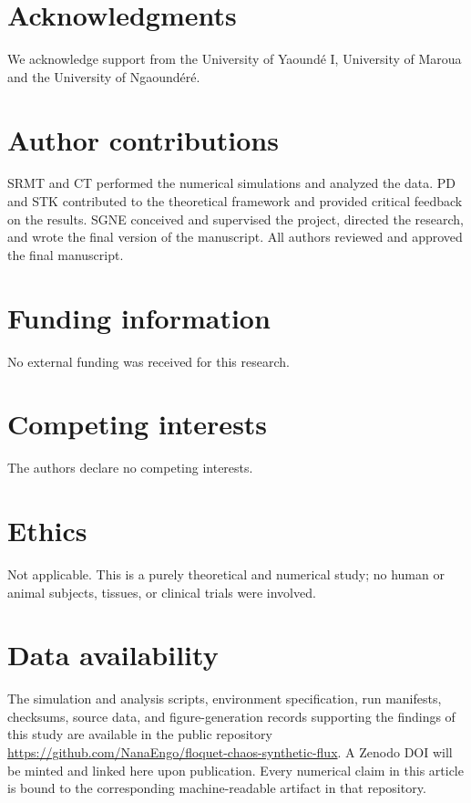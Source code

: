 \documentclass[aip,cha,reprint]{revtex4-2}
\begin{document}
\section*{Acknowledgments}
We acknowledge support from the University of Yaound\'e I, University of Maroua
and the University of Ngaound\'er\'e.

\section*{Author contributions}
SRMT and CT performed the numerical simulations and analyzed the data. PD and
STK contributed to the theoretical framework and provided critical feedback on
the results. SGNE conceived and supervised the project, directed the research,
and wrote the final version of the manuscript. All authors reviewed and
approved the final manuscript.

\section*{Funding information}
No external funding was received for this research.

\section*{Competing interests}
The authors declare no competing interests.

\section*{Ethics}
Not applicable. This is a purely theoretical and numerical study; no human or
animal subjects, tissues, or clinical trials were involved.

\section*{Data availability}
The simulation and analysis scripts, environment specification, run manifests,
checksums, source data, and figure-generation records supporting the findings of
this study are available in the public repository
\url{https://github.com/NanaEngo/floquet-chaos-synthetic-flux}. A Zenodo DOI
will be minted and linked here upon publication. Every numerical claim in this
article is bound to the corresponding machine-readable artifact in that
repository.


\end{document}
